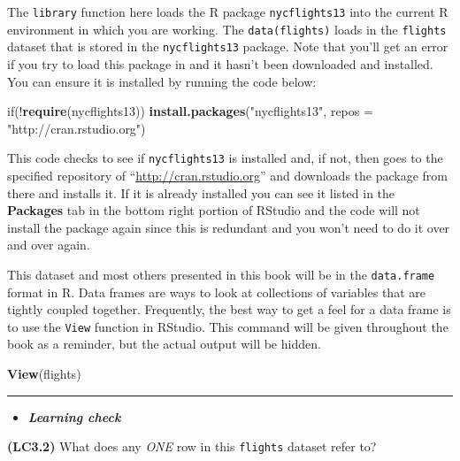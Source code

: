 \documentclass[]{tufte-book}
\newenvironment{Shaded}{\begin{snugshade}}{\end{snugshade}}
\newcommand{\KeywordTok}[1]{\textcolor[rgb]{0.13,0.29,0.53}{\textbf{{#1}}}}
\newcommand{\DataTypeTok}[1]{\textcolor[rgb]{0.13,0.29,0.53}{{#1}}}
\newcommand{\StringTok}[1]{\textcolor[rgb]{0.31,0.60,0.02}{{#1}}}
\newcommand{\NormalTok}[1]{{#1}}
\let\oldrule=\rule
\renewcommand{\rule}[1]{\oldrule{\linewidth}}
\newenvironment{rmdblock}[1]
  {\begin{shaded*}
  \begin{itemize}
  \renewcommand{\labelitemi}{
    \raisebox{-.7\height}[0pt][0pt]{
    }
  }
  \item
  }
  {
  \end{itemize}
  \end{shaded*}
  }
\newenvironment{learncheck}
  {\begin{rmdblock}{warning}}
  {\end{rmdblock}}
\begin{document}
The \texttt{library} function here loads the R package
\texttt{nycflights13} into the current R environment in which you are
working. The \texttt{data(flights)} loads in the \texttt{flights}
dataset that is stored in the \texttt{nycflights13} package. Note that
you'll get an error if you try to load this package in and it hasn't
been downloaded and installed. You can ensure it is installed by running
the code below:

\begin{Shaded}
\begin{Highlighting}[]
\NormalTok{if(!}\KeywordTok{require}\NormalTok{(nycflights13))}
  \KeywordTok{install.packages}\NormalTok{(}\StringTok{"nycflights13"}\NormalTok{, }\DataTypeTok{repos =} \StringTok{"http://cran.rstudio.org"}\NormalTok{)}
\end{Highlighting}
\end{Shaded}

This code checks to see if \texttt{nycflights13} is installed and, if
not, then goes to the specified repository of
``\url{http://cran.rstudio.org}'' and downloads the package from there
and installs it. If it is already installed you can see it listed in the
\textbf{Packages} tab in the bottom right portion of RStudio and the
code will not install the package again since this is redundant and you
won't need to do it over and over again.

This dataset and most others presented in this book will be in the
\texttt{data.frame} format in R. Data frames are ways to look at
collections of variables that are tightly coupled together. Frequently,
the best way to get a feel for a data frame is to use the \texttt{View}
function in RStudio. This command will be given throughout the book as a
reminder, but the actual output will be hidden.

\begin{Shaded}
\begin{Highlighting}[]
\KeywordTok{View}\NormalTok{(flights)}
\end{Highlighting}
\end{Shaded}

\begin{center}\rule{0.5\linewidth}{\linethickness}\end{center}

\begin{learncheck}
\textbf{\emph{Learning check}}
\end{learncheck}

\textbf{(LC3.2)} What does any \emph{ONE} row in this \texttt{flights}
dataset refer to?
\end{document}
